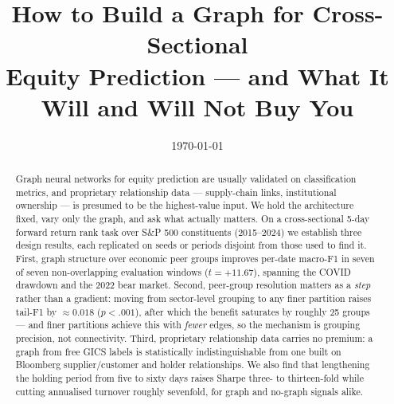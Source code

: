 \documentclass[11pt]{airesearch}
\title{\Huge \bfseries How to Build a Graph for Cross-Sectional\\
Equity Prediction --- and What It Will and Will Not Buy You}
\date{\today}
\begin{document}
\maketitle

\begin{abstract}
Graph neural networks for equity prediction are usually validated on
classification metrics, and proprietary relationship data --- supply-chain
links, institutional ownership --- is presumed to be the highest-value input.
We hold the architecture fixed, vary only the graph, and ask what actually
matters. On a cross-sectional 5-day forward return rank task over S\&P 500
constituents (2015--2024) we establish three design results, each replicated
on seeds or periods disjoint from those used to find it. First, graph
structure over economic peer groups improves per-date macro-F1 in seven of
seven non-overlapping evaluation windows ($t=+11.67$), spanning the COVID
drawdown and the 2022 bear market. Second, peer-group resolution matters as a
\emph{step} rather than a gradient: moving from sector-level grouping to any
finer partition raises tail-F1 by ${\approx}0.018$ ($p<.001$), after which the
benefit saturates by roughly 25 groups --- and finer partitions achieve this
with \emph{fewer} edges, so the mechanism is grouping precision, not
connectivity. Third, proprietary relationship data carries no premium: a graph
from free GICS labels is statistically indistinguishable from one built on
Bloomberg supplier/customer and holder relationships. We also find that
lengthening the holding period from five to sixty days raises Sharpe three- to
thirteen-fold while cutting annualised turnover roughly sevenfold, for graph
and no-graph signals alike.


\end{abstract}
\end{document}
